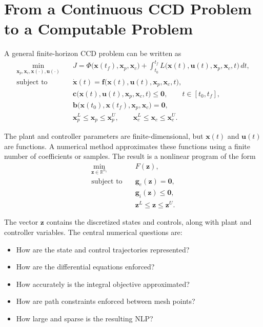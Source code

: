 \documentclass[11pt]{article}
\newcommand{\vect}[1]{\boldsymbol{#1}}
\newcommand{\xp}{\vect{x}_p}
\newcommand{\xc}{\vect{x}_c}
\newcommand{\xstate}{\vect{x}}
\newcommand{\uvec}{\vect{u}}
\newcommand{\zvec}{\vect{z}}
\newcommand{\fvec}{\vect{f}}
\newcommand{\cvec}{\vect{c}}
\newcommand{\gvec}{\vect{g}}
\newcommand{\R}{\mathbb{R}}
\begin{document}
\section{From a Continuous CCD Problem to a Computable Problem}

A general finite-horizon CCD problem can be written as
\begin{align}
\min_{\xp,\xc,\xstate(\cdot),\uvec(\cdot)} \quad &
J = \Phi\big(\xstate(t_f),\xp,\xc\big)
+ \int_{t_0}^{t_f} L\big(\xstate(t),\uvec(t),\xp,\xc,t\big)\,dt,
\label{eq:continuous-ccd-objective}\\
\text{subject to} \quad &
\dot{\xstate}(t)=\fvec\big(\xstate(t),\uvec(t),\xp,\xc,t\big),
\label{eq:continuous-ccd-dyn}\\
& \cvec\big(\xstate(t),\uvec(t),\xp,\xc,t\big)\leq \vect{0},
\qquad t\in[t_0,t_f],
\label{eq:continuous-ccd-path}\\
& \vect{b}\big(\xstate(t_0),\xstate(t_f),\xp,\xc\big)=\vect{0},
\label{eq:continuous-ccd-boundary}\\
& \xp^L\leq\xp\leq\xp^U, \qquad \xc^L\leq\xc\leq\xc^U.
\end{align}

The plant and controller parameters are finite-dimensional, but $\xstate(t)$ and $\uvec(t)$ are functions. A numerical method approximates these functions using a finite number of coefficients or samples. The result is a nonlinear program of the form
\begin{align}
\min_{\zvec\in\R^{n_z}} \quad & F(\zvec),\\
\text{subject to} \quad & \gvec_e(\zvec)=\vect{0},\\
& \gvec_i(\zvec)\leq\vect{0},\\
& \zvec^L\leq\zvec\leq\zvec^U.
\end{align}

The vector $\zvec$ contains the discretized states and controls, along with plant and controller variables. The central numerical questions are:
\begin{itemize}[leftmargin=1.4em]
  \item How are the state and control trajectories represented?
  \item How are the differential equations enforced?
  \item How accurately is the integral objective approximated?
  \item How are path constraints enforced between mesh points?
  \item How large and sparse is the resulting NLP?
\end{itemize}
\end{document}
